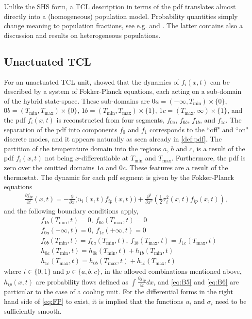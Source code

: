 \documentclass[submission,copyright,creativecommons]{eptcs}
\begin{document}
Unlike the SHS form, a TCL description in terms of the pdf translates almost directly into a (homogeneous) population model.  Probability quantities simply change meaning to  population fractions, see e.g. \cite{malhame1985electric} and \cite{totu2014demand}. The latter contains also a discussion and results on heterogeneous populations.

\subsection{Unactuated TCL}

For an unactuated TCL unit, \cite{malhame1985electric} showed that the dynamics of $f_i(x,t)$ can be described by a system of Fokker-Planck equations, each acting on a sub-domain of the hybrid state-space. These sub-domains are $0a= (-\infty, T_{\min}) \times \{0 \}$, $0b= (T_{\min}, T_{\max}) \times \{0\}$, $1b= (T_{\min}, T_{\max}) \times \{1\}$, $1c= (T_{\max}, \infty) \times \{1\}$, and the pdf $f_i(x,t)$ is reconstructed from four segments, $f_{0a}$, $f_{0b}$, $f_{1b}$, and $f_{1c}$. The separation of the pdf into components $f_0$ and $f_1$ corresponds to the ``off" and ``on" discrete modes, and it appears naturally as seen already in \eqref{def:pdf}. The partition of the temperature domain into the regions $a$, $b$ and $c$, is a result of the pdf $f_i(x,t)$ not being $x$-differentiable at $T_{\min}$ and $T_{\max}$. Furthermore, the pdf is zero over the omitted domains $1a$ and $0c$. These features are a result of the thermostat. 
The dynamic for each pdf segment is given by the Fokker-Planck equations
\begin{align}
   \frac{\partial f_{ip}}{\partial t}(x,t) = - \frac{\partial}{\partial x} \bigg( u_i(x,t) f_{ip}(x,t) \bigg) +  \frac{\partial^2}{\partial x^2} \left( \frac{1}{2} \sigma_i^2(x,t) f_{ip}(x,t) \right), \label{eq:FP}
\end{align}
and the following boundary conditions apply,
\begin{subequations}   \label{eq:PDE_boundary} 
\begin{align}
  & f_{1b}(T_\mathrm{min},t) = 0,~  f_{0b}(T_\mathrm{max},t) = 0  \\
  &f_{0a}(-\infty,t) = 0, ~ f_{1c}(+\infty,t) = 0  \\
  &f_{0b}(T_\mathrm{min},t) =  f_{0a}(T_\mathrm{min},t),~  f_{1b}(T_\mathrm{max},t) =  f_{1c}(T_\mathrm{max},t) \\
  & h_{0a}(T_\mathrm{min},t) =  h_{0b}(T_\mathrm{min},t) + h_{1b}(T_\mathrm{min},t) \label{eq:B5}\\ 
  & h_{1c}(T_\mathrm{max},t) =  h_{0b}(T_\mathrm{max},t) + h_{1b}(T_\mathrm{max},t) \label{eq:B6} 
\end{align}
\end{subequations}
where $i \in \{0,1\}$ and $p \in \{a,b,c\}$, in the allowed combinations mentioned above, $h_{ip}(x,t)$ are probability flows defined as $\int \frac{\partial f_{ip}}{\partial t} dx$,  and  \eqref{eq:B5} and \eqref{eq:B6} are particular to the case of a cooling unit. For the differential forms in the right hand side of \eqref{eq:FP} to exist, it is implied that the functions $u_i$ and $\sigma_i$ need to be sufficiently smooth. 
\end{document}
